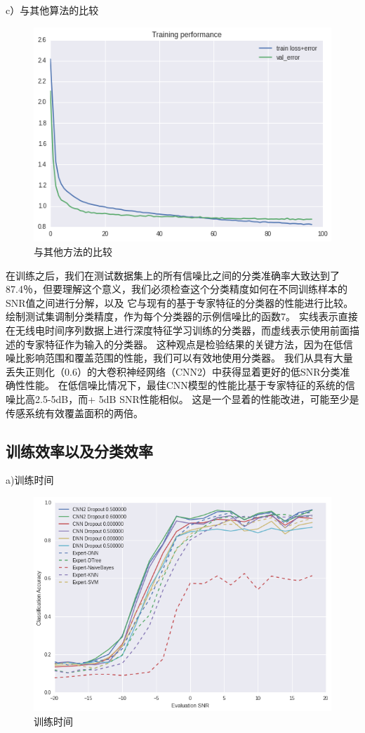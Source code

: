 c）与其他算法的比较
\begin{figure}[!h]
	\centering
	\includegraphics[scale=0.3]{figures/chapter_3/loss}
	\caption{与其他方法的比较}	\label{sec:fig_3_11}
\end{figure}

在训练之后，我们在测试数据集上的所有信噪比之间的分类准确率大致达到了87.4％，但要理解这个意义，我们必须检查这个分类精度如何在不同训练样本的SNR值之间进行分解，以及 它与现有的基于专家特征的分类器的性能进行比较。绘制测试集调制分类精度，作为每个分类器的示例信噪比的函数7。 实线表示直接在无线电时间序列数据上进行深度特征学习训练的分类器，而虚线表示使用前面描述的专家特征作为输入的分类器。 这种观点是检验结果的关键方法，因为在低信噪比影响范围和覆盖范围的性能，我们可以有效地使用分类器。 我们从具有大量丢失正则化（0.6）的大卷积神经网络（CNN2）中获得显着更好的低SNR分类准确性性能。 在低信噪比情况下，最佳CNN模型的性能比基于专家特征的系统的信噪比高2.5-5dB，而+ 5dB SNR性能相似。 这是一个显着的性能改进，可能至少是传感系统有效覆盖面积的两倍。\par


\subsection{训练效率以及分类效率}

a)训练时间
\begin{figure}[!h]
	\centering
	\includegraphics[scale=0.3]{figures/chapter_3/result}
	\caption{训练时间}	\label{sec:fig_3_12}
\end{figure}

